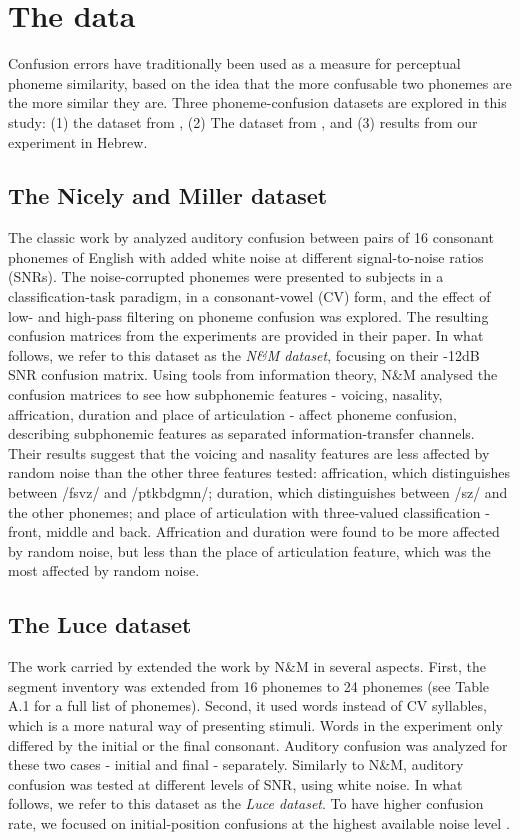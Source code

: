 \section{The data}
Confusion errors have traditionally been used as a measure for perceptual phoneme similarity, based on the idea that the more confusable two phonemes are the more similar they are. Three phoneme-confusion datasets are explored in this study: (1) the dataset from \citet{NicelyMiller1955}, (2) The dataset from \citet{Luce1987}, and (3) results from our experiment in Hebrew.

\subsection{The Nicely and Miller dataset} The classic work by \citet{NicelyMiller1955} analyzed auditory confusion between pairs of 16 consonant phonemes of English with added white noise at different signal-to-noise ratios (SNRs). The noise-corrupted phonemes were presented to subjects in a classification-task paradigm, in a consonant-vowel (CV) form, and the effect of low- and high-pass filtering on phoneme confusion was explored. The resulting confusion matrices from the experiments are provided in their paper. In what follows, we refer to this dataset as the \textit{N\&M dataset}, focusing on their -12dB SNR confusion matrix. Using tools from information theory, N\&M analysed the confusion matrices to see how subphonemic features - voicing, nasality, affrication, duration and place of articulation - affect phoneme confusion, describing subphonemic features as separated information-transfer channels. Their results suggest that the voicing and nasality features are less affected by random noise than the other three features tested: affrication, which distinguishes between /fsvz/ and /ptkbdgmn/; duration, which distinguishes between /sz/ and the other phonemes; and place of articulation with three-valued classification - front, middle and back. Affrication and duration were found to be more affected by random noise, but less than the place of articulation feature, which was the most affected by random noise. 

\subsection{The Luce dataset} The work carried by \citet{Luce1987} extended the work by N\&M in several aspects. First, the segment inventory was extended from 16 phonemes to 24 phonemes (see Table A.1 for a full list of phonemes). Second, it used words instead of CV syllables, which is a more natural way of presenting stimuli. Words in the experiment only differed by the initial or the final consonant. Auditory confusion was analyzed for these two cases - initial and final - separately. Similarly to N\&M, auditory confusion was tested at different levels of SNR, using white noise. In what follows, we refer to this dataset as the \textit{Luce dataset}. To have higher confusion rate, we focused on initial-position confusions at the highest available noise level \citep{Redford1999}.

